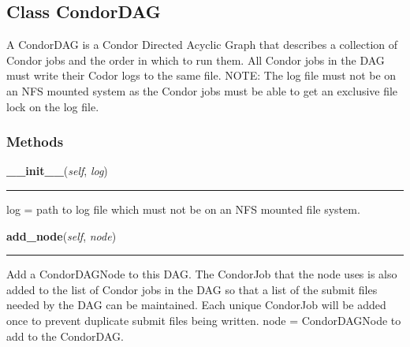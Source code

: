 \subsection{Class CondorDAG}

    \label{pipeline:CondorDAG}
A CondorDAG is a Condor Directed Acyclic Graph that describes a 
collection of Condor jobs and the order in which to run them. All Condor 
jobs in the DAG must write their Codor logs to the same file. NOTE: The 
log file must not be on an NFS mounted system as the Condor jobs must be 
able to get an exclusive file lock on the log file.



  \subsubsection{Methods}

    \label{pipeline:CondorDAG:__init__}
    \vspace{0.5ex}

    \noindent\begin{boxedminipage}{\textwidth}

    \raggedright \textbf{\_\_init\_\_}(\textit{self}, \textit{log})

    \vspace{-1.5ex}

    \rule{\textwidth}{0.5\fboxrule}
    log = path to log file which must not be on an NFS mounted file 
    system.

    \vspace{1ex}

    \end{boxedminipage}

    \label{pipeline:CondorDAG:add_node}
    \vspace{0.5ex}

    \noindent\begin{boxedminipage}{\textwidth}

    \raggedright \textbf{add\_node}(\textit{self}, \textit{node})

    \vspace{-1.5ex}

    \rule{\textwidth}{0.5\fboxrule}
    Add a CondorDAGNode to this DAG. The CondorJob that the node uses is 
    also added to the list of Condor jobs in the DAG so that a list of 
    the submit files needed by the DAG can be maintained. Each unique 
    CondorJob will be added once to prevent duplicate submit files being 
    written. node = CondorDAGNode to add to the CondorDAG.

    \vspace{1ex}

    \end{boxedminipage}

